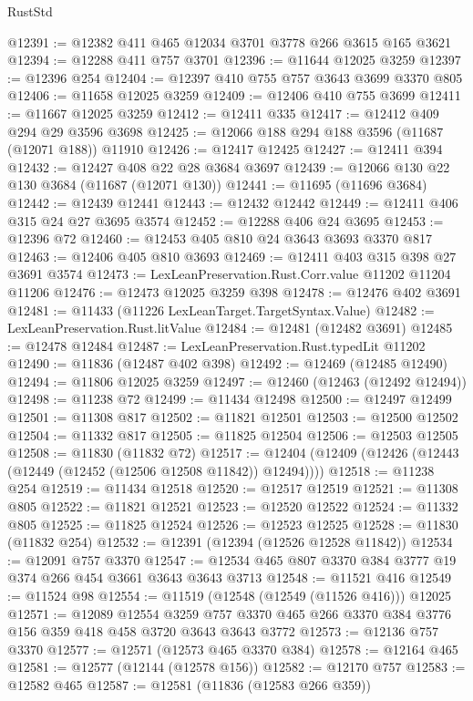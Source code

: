 \begin{lexlean}{RustStd}
\begin{coremodule}
@12391 := @12382 @411 @465 @12034 @3701 @3778 @266 @3615 @165 @3621
@12394 := @12288 @411 @757 @3701
@12396 := @11644 @12025 @3259
@12397 := @12396 @254
@12404 := @12397 @410 @755 @757 @3643 @3699 @3370 @805
@12406 := @11658 @12025 @3259
@12409 := @12406 @410 @755 @3699
@12411 := @11667 @12025 @3259
@12412 := @12411 @335
@12417 := @12412 @409 @294 @29 @3596 @3698
@12425 := @12066 @188 @294 @188 @3596 (@11687 (@12071 @188)) @11910
@12426 := @12417 @12425
@12427 := @12411 @394
@12432 := @12427 @408 @22 @28 @3684 @3697
@12439 := @12066 @130 @22 @130 @3684 (@11687 (@12071 @130))
@12441 := @11695 (@11696 @3684)
@12442 := @12439 @12441
@12443 := @12432 @12442
@12449 := @12411 @406 @315 @24 @27 @3695 @3574
@12452 := @12288 @406 @24 @3695
@12453 := @12396 @72
@12460 := @12453 @405 @810 @24 @3643 @3693 @3370 @817
@12463 := @12406 @405 @810 @3693
@12469 := @12411 @403 @315 @398 @27 @3691 @3574
@12473 := LexLeanPreservation.Rust.Corr.value @11202 @11204 @11206
@12476 := @12473 @12025 @3259 @398
@12478 := @12476 @402 @3691
@12481 := @11433 (@11226 LexLeanTarget.TargetSyntax.Value)
@12482 := LexLeanPreservation.Rust.litValue
@12484 := @12481 (@12482 @3691)
@12485 := @12478 @12484
@12487 := LexLeanPreservation.Rust.typedLit @11202
@12490 := @11836 (@12487 @402 @398)
@12492 := @12469 (@12485 @12490)
@12494 := @11806 @12025 @3259
@12497 := @12460 (@12463 (@12492 @12494))
@12498 := @11238 @72
@12499 := @11434 @12498
@12500 := @12497 @12499
@12501 := @11308 @817
@12502 := @11821 @12501
@12503 := @12500 @12502
@12504 := @11332 @817
@12505 := @11825 @12504
@12506 := @12503 @12505
@12508 := @11830 (@11832 @72)
@12517 := @12404 (@12409 (@12426 (@12443 (@12449 (@12452 (@12506 @12508 @11842)) @12494))))
@12518 := @11238 @254
@12519 := @11434 @12518
@12520 := @12517 @12519
@12521 := @11308 @805
@12522 := @11821 @12521
@12523 := @12520 @12522
@12524 := @11332 @805
@12525 := @11825 @12524
@12526 := @12523 @12525
@12528 := @11830 (@11832 @254)
@12532 := @12391 (@12394 (@12526 @12528 @11842))
@12534 := @12091 @757 @3370
@12547 := @12534 @465 @807 @3370 @384 @3777 @19 @374 @266 @454 @3661 @3643 @3643 @3713
@12548 := @11521 @416
@12549 := @11524 @98
@12554 := @11519 (@12548 (@12549 (@11526 @416))) @12025
@12571 := @12089
    @12554
    @3259
    @757
    @3370
    @465
    @266
    @3370
    @384
    @3776
    @156
    @359
    @418
    @458
    @3720
    @3643
    @3643
    @3772
@12573 := @12136 @757 @3370
@12577 := @12571 (@12573 @465 @3370 @384)
@12578 := @12164 @465
@12581 := @12577 (@12144 (@12578 @156))
@12582 := @12170 @757
@12583 := @12582 @465
@12587 := @12581 (@11836 (@12583 @266 @359))

\end{coremodule}
\end{lexlean}
